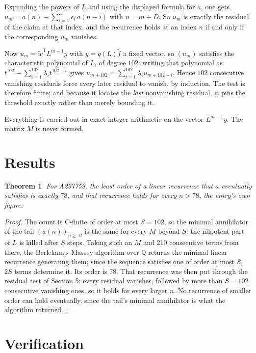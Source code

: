 \documentclass[11pt]{article}
\newtheorem{theorem}{Theorem}
\theoremstyle{definition}
\begin{document}
Expanding the powers of $L$ and using the displayed formula for $a$, one gets $u_m = a(n) - \sum_{i=1}^{D} c_i\,a(n-i)$ with $n = m + D$. So $u_m$ is exactly the residual of the claim at that index, and the recurrence holds at an index $n$ if and only if the corresponding $u_m$ vanishes.

Now $u_m = \tilde w^{\mathsf T} L^{m-1} y$ with $y = q(L)\tilde f$ a fixed vector, so $(u_m)$ satisfies the characteristic polynomial of $L$, of degree $102$: writing that polynomial as $t^{102} - \sum_{i=1}^{102} \lambda_i t^{102-i}$ gives $u_{m+102} = \sum_{i=1}^{102} \lambda_i u_{m+102-i}$. Hence $102$ consecutive vanishing residuals force every later residual to vanish, by induction. The test is therefore finite; and because it locates the {\itshape last} nonvanishing residual, it pins the threshold exactly rather than merely bounding it.

Everything is carried out in exact integer arithmetic on the vector $L^{m-1}y$. The matrix $M$ is never formed.

\section{Results}

\begin{theorem} For A297759, the least order of a linear recurrence that $a$ eventually satisfies is exactly $78$, and that recurrence holds for every $n > 78$, the entry's own figure.\end{theorem}

{\itshape Proof.} The count is C-finite of order at most $S = 102$, so the minimal annihilator of the tail $(a(n))_{n \ge M}$ is the same for every $M$ beyond $S$: the nilpotent part of $L$ is killed after $S$ steps. Taking such an $M$ and $210$ consecutive terms from there, the Berlekamp--Massey algorithm over $\mathbb{Q}$ returns the minimal linear recurrence generating them; since the sequence satisfies one of order at most $S$, $2S$ terms determine it. Its order is $78$. That recurrence was then put through the residual test of Section 5: every residual vanishes, followed by more than $S = 102$ consecutive vanishing ones, so it holds for every larger $n$. No recurrence of smaller order can hold eventually, since the tail's minimal annihilator is what the algorithm returned. $\square$

\section{Verification}
\end{document}

